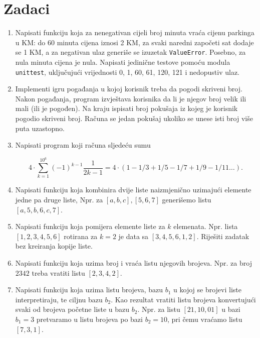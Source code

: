 \section*{Zadaci}
\begin{enumerate}

    \item Napisati funkciju koja za nenegativan cijeli broj minuta vraća cijenu parkinga u KM: do 60 minuta cijena iznosi 2 KM, za svaki naredni započeti sat dodaje se 1 KM, a za negativan ulaz generiše se izuzetak \texttt{ValueError}. Posebno, za nula minuta cijena je nula. Napisati jedinične testove pomoću modula \texttt{unittest}, uključujući vrijednosti 0, 1, 60, 61, 120, 121 i nedopustiv ulaz.

    
    \item Implementi igru pogađanja u kojoj korisnik treba da pogodi skriveni broj. Nakon pogađanja, program izvještava korisnika da li je njegov broj velik ili mali (ili je pogođen). Na kraju ispisati broj  pokušaja iz kojeg je korisnik pogodio skriveni broj. Računa se jedan pokušaj ukoliko se unese isti broj više puta uzastopno.
    
    
	\item Napisati program koji računa sljedeću sumu  
	
	$$ 4 \cdot \sum_{k=1}^{10^6}(-1)^{k-1} \frac{1}{2k-1}= 4 \cdot (1-1/3 + 1/5-1/7+1/9-1/11 \ldots).$$
	
	\item Napisati funkciju koja kombinira dvije liste naizmjenično uzimajući elemente jedne pa druge liste, Npr. za $[a,b,c], [5, 6, 7]$ generišemo listu $[a,5,b,6,c,7]$.
	
	\item Napisati funkciju koja pomijera elemente liste za $k$ elemenata. Npr. lista  $[1,2,3,4,5,6]$ rotirana za $k=2$ je data sa $[3,4,5,6,1,2]$. Riješiti zadatak bez kreiranja kopije liste. 
	
	\item Napisati funkciju koja uzima broj i vraća listu njegovih brojeva. Npr. za broj $2342$ treba vratiti listu $[2,3,4,2]$.
	
	\item Napisati funkciju koja uzima listu brojeva,   bazu $b_1$ u kojoj se brojevi liste interpretiraju, te ciljnu bazu $b_2$.  Kao rezultat vratiti listu brojeva konvertujući svaki od brojeva početne liste u bazu $b_2$. Npr. za listu $[21,10,01]$ u bazi $b_1 = 3$ pretvaramo u listu brojeva po bazi $b_2=10$, pri čemu vraćamo listu $[7,3, 1]$.
	

\end{enumerate}
